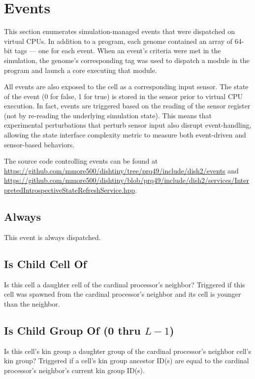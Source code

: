 \section{Events}

This section enumerates simulation-managed events that were dispatched on virtual CPUs.
In addition to a program, each genome contained an array of 64-bit tags --- one for each event.
When an event's criteria were met in the simulation, the genome's corresponding tag was used to dispatch a module in the program and launch a core executing that module.

All events are also exposed to the cell as a corresponding input sensor.
The state of the event (0 for false, 1 for true) is stored in the sensor prior to virtual CPU execution.
In fact, events are triggered based on the reading of the sensor register (not by re-reading the underlying simulation state).
This means that experimental perturbations that perturb sensor input also disrupt event-handling, allowing the state interface complexity metric to measure both event-driven and sensor-based behaviors.

The source code controlling events can be found at \url{https://github.com/mmore500/dishtiny/tree/prq49/include/dish2/events} and \url{https://github.com/mmore500/dishtiny/blob/prq49/include/dish2/services/InterpretedIntrospectiveStateRefreshService.hpp}.

\subsection{Always}

This event is always dispatched.

\subsection{Is Child Cell Of}

Is this cell a daughter cell of the cardinal processor's neighbor?
Triggered if this cell was spawned from the cardinal processor's neighbor and its cell is younger than the neighbor.

\subsection{Is Child Group Of (0 thru $L-1$)}

Is this cell's kin group a daughter group of the cardinal processor's neighbor cell's kin group?
Triggered if a cell's kin group ancestor ID(s) are equal to the cardinal processor's neighbor's current kin group ID(s).

